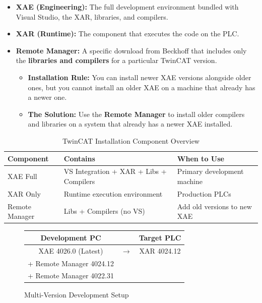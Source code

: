 \documentclass[11pt,a4paper]{article}
\begin{document}
\begin{itemize}[leftmargin=*]
    \item \textbf{XAE (Engineering):} The full development environment bundled with Visual Studio, the XAR, libraries, and compilers.
    \item \textbf{XAR (Runtime):} The component that executes the code on the PLC.
    \item \textbf{Remote Manager:} A specific download from Beckhoff that includes only the \textbf{libraries and compilers} for a particular TwinCAT version.
    \begin{itemize}
        \item \textbf{Installation Rule:} You can install newer XAE versions alongside older ones, but you cannot install an older XAE on a machine that already has a newer one.
        \item \textbf{The Solution:} Use the \textbf{Remote Manager} to install older compilers and libraries on a system that already has a newer XAE installed.
    \end{itemize}
\end{itemize}

\begin{table}[h]
\centering
\begin{tabular}{@{}llp{5cm}@{}}
\toprule
\textbf{Component} & \textbf{Contains} & \textbf{When to Use} \\
\midrule
XAE Full & VS Integration + XAR + Libs + Compilers & Primary development machine \\
XAR Only & Runtime execution environment & Production PLCs \\
Remote Manager & Libs + Compilers (no VS) & Add old versions to new XAE \\
\bottomrule
\end{tabular}
\caption{TwinCAT Installation Component Overview}
\end{table}

\begin{figure}[h]
\centering
\begin{tabular}{|c|c|c|}
\hline
\textbf{Development PC} & & \textbf{Target PLC} \\
\hline
XAE 4026.0 (Latest) & $\rightarrow$ & XAR 4024.12 \\
+ Remote Manager 4024.12 & & \\
+ Remote Manager 4022.31 & & \\
\hline
\end{tabular}
\caption{Multi-Version Development Setup}
\end{figure}
\end{document}
